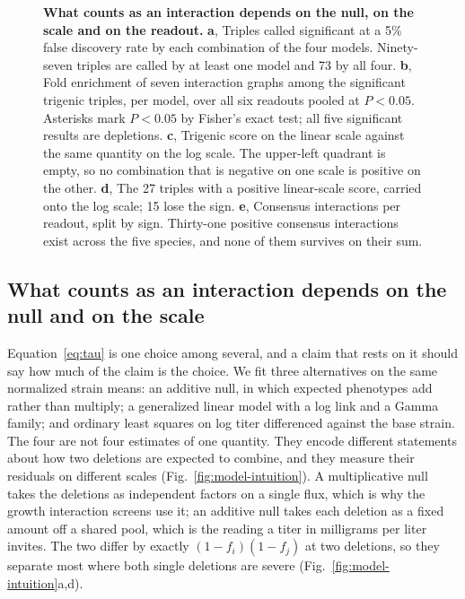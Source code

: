 \begin{figure}[t]
\caption{\textbf{What counts as an interaction depends on the null, on the scale and on the
readout.} \textbf{a}, Triples called significant at a 5\% false discovery rate by each
combination of the four models. Ninety-seven triples are called by at least one model and 73
by all four. \textbf{b}, Fold enrichment of seven interaction graphs among the significant
trigenic triples, per model, over all six readouts pooled at $P < 0.05$. Asterisks mark
$P < 0.05$ by Fisher's exact test; all five significant results are depletions.
\textbf{c}, Trigenic score on the linear scale against the same quantity on the log scale.
The upper-left quadrant is empty, so no combination that is negative on one scale is
positive on the other. \textbf{d}, The 27 triples with a positive linear-scale score,
carried onto the log scale; 15 lose the sign. \textbf{e}, Consensus interactions per
readout, split by sign. Thirty-one positive consensus interactions exist across the five
species, and none of them survives on their sum.}
\label{fig:models}
\end{figure}


\FloatBarrier
\subsection*{What counts as an interaction depends on the null and on the scale}

Equation~\ref{eq:tau} is one choice among several, and a claim that rests on it should say
how much of the claim is the choice. We fit three alternatives on the same normalized strain
means: an additive null, in which expected phenotypes add rather than multiply; a
generalized linear model with a log link and a Gamma family; and ordinary least squares on
log titer differenced against the base strain. The four are not four estimates of one
quantity. They encode different statements about how two deletions are expected to combine,
and they measure their residuals on different scales
(Fig.~\ref{fig:model-intuition}). A multiplicative null takes the deletions as independent
factors on a single flux, which is why the growth interaction screens use it; an additive
null takes each deletion as a fixed amount off a shared pool, which is the reading a titer
in milligrams per liter invites. The two differ by
exactly $(1 - f_i)(1 - f_j)$ at two deletions, so they separate most where both single
deletions are severe (Fig.~\ref{fig:model-intuition}a,d).

